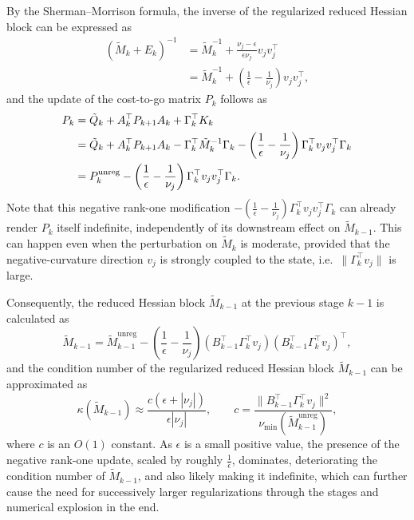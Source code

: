 \documentclass[class=scrbook, crop=false]{standalone}
\begin{document}
By the Sherman--Morrison formula, the inverse of the regularized reduced Hessian block can be expressed as
\begin{align*}
    (\tilde{M}_k + E_k)^{-1} &= \tilde{M}_k^{-1} + \frac{\nu_j-\epsilon}{\epsilon \nu_j} v_j v_j^\top \\
                            &= \tilde{M}_k^{-1} + \left(\frac{1}{\epsilon} - \frac{1}{\nu_j}\right) v_j v_j^\top,
\end{align*}
and the update of the cost-to-go matrix $P_k$ follows as
\begin{align}
    P_k &= \tilde{Q}_k + A_k^\top P_{k+1} A_k + \Gamma_k^\top K_k \notag \\
        &=\tilde{Q}_k + A_k^\top P_{k+1} A_k - \Gamma_k^\top \tilde{M}_k^{-1} \Gamma_k - \left(\frac{1}{\epsilon} - \frac{1}{\nu_j}\right) \Gamma_k^\top v_j v_j^\top \Gamma_k \notag \\
        &= P_k^{\mathrm{unreg}} - \left(\frac{1}{\epsilon} - \frac{1}{\nu_j}\right) \Gamma_k^\top v_j v_j^\top \Gamma_k.
\end{align}
Note that this negative rank-one modification $- \left(\frac{1}{\epsilon} - \frac{1}{\nu_j}\right) \Gamma_k^\top v_j v_j^\top \Gamma_k$ 
can already render $P_k$ itself indefinite, independently of its downstream effect on $\tilde{M}_{k-1}$. 
This can happen even when the perturbation on $\tilde{M}_k$ is moderate,
provided that the negative-curvature direction $v_j$ is strongly coupled to the state, i.e.\ $\|\Gamma_k^\top v_j\|$ is large.

Consequently, the reduced Hessian block $\tilde{M}_{k-1}$ at the previous stage $k-1$ is calculated as
\begin{equation}
    \tilde{M}_{k-1} = \tilde{M}_{k-1}^{\mathrm{unreg}} - \left(\frac{1}{\epsilon} - \frac{1}{\nu_j}\right) (B_{k-1}^\top \Gamma_k^\top v_j) (B_{k-1}^\top \Gamma_k^\top v_j)^\top,
\end{equation}
and the condition number of the regularized reduced Hessian block $\tilde{M}_{k-1}$ can be approximated as
\begin{equation}
    \kappa(\tilde{M}_{k-1}) \approx \frac{c (\epsilon + |\nu_j|)}{\epsilon |\nu_j|},
    \qquad
    c = \frac{\|B_{k-1}^\top \Gamma_k^\top v_j\|^2}{\nu_{\min}(\tilde{M}_{k-1}^{\mathrm{unreg}})},
\end{equation}
where $c$ is an $O(1)$ constant.
As $\epsilon$ is a small positive value,
the presence of the negative rank-one update, scaled by roughly $\frac{1}{\epsilon}$, dominates,
deteriorating the condition number of $\tilde{M}_{k-1}$, and also likely making it indefinite,
which can further cause the need for successively larger regularizations through the stages and numerical explosion in the end.
\end{document}

